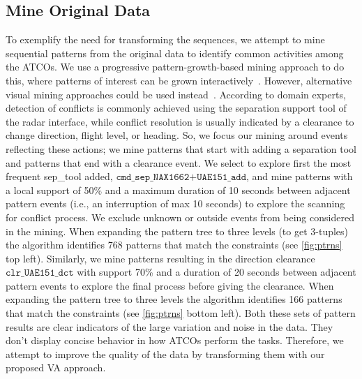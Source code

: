 \documentclass[camera]{vgtc}                          %
\begin{document}
\subsection{Mine Original Data}
To exemplify the need for transforming the sequences, we attempt to mine sequential patterns from the original data to identify common activities among the ATCOs. We use a progressive pattern-growth-based mining approach to do this, where patterns of interest can be grown interactively~\cite{Vrotsou2019Exploratory}. However, alternative visual mining approaches could be used instead~\cite{Jentner2019Visualization}. 
According to domain experts, detection of conflicts is commonly achieved using the separation support tool of the radar interface, while conflict resolution is usually indicated by a clearance to change direction, flight level, or heading. So, we focus our mining around events reflecting these actions; we mine patterns that start with adding a separation tool and patterns that end with a clearance event. We select to explore first the most frequent sep\_tool added, $ \texttt{cmd\_sep\_NAX1662+UAE151\_add} $, and mine patterns with a local support of 50\% and a maximum duration of 10 seconds between adjacent pattern events (i.e., an interruption of max 10 seconds) to explore the scanning for conflict process. We exclude unknown or outside events from being considered in the mining. When expanding the pattern tree to three levels (to get 3-tuples) the algorithm identifies 768 patterns that match the constraints (see \autoref{fig:ptrns} top left).
Similarly, we mine patterns resulting in the direction clearance $ \texttt{clr\_UAE151\_dct} $ with support 70\% and a duration of 20 seconds between adjacent pattern events to explore the final process before giving the clearance. When expanding the pattern tree to three levels the algorithm identifies 166 patterns that match the constraints (see \autoref{fig:ptrns} bottom left). Both these sets of pattern results are clear indicators of the large variation and noise in the data. They don't display concise behavior in how ATCOs perform the tasks. Therefore, we attempt to improve the quality of the data by transforming them with our proposed VA approach. 
\end{document}
